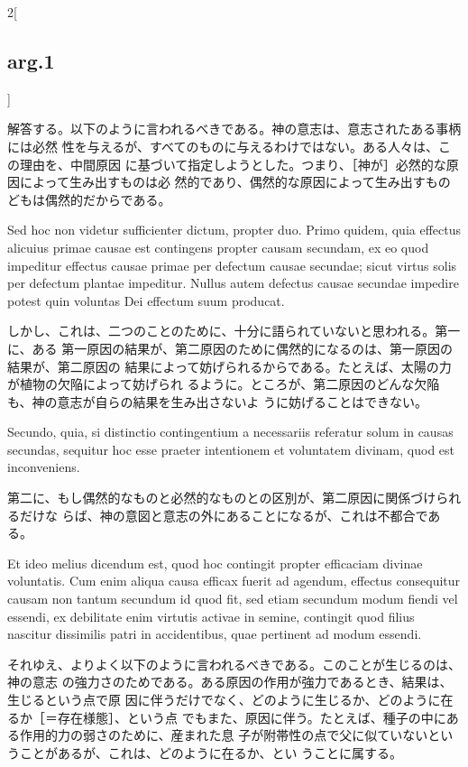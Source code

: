 \documentclass[paper=a4paper,fontsize=10pt,jafontsize=9pt,titlepage]{jlreq}
\begin{document}
\begin{paracol}{2}[\subsection{arg.1}]
\switchcolumn

解答する。以下のように言われるべきである。神の意志は、意志されたある事柄には必然
性を与えるが、すべてのものに与えるわけではない。ある人々は、この理由を、中間原因
に基づいて指定しようとした。つまり、［神が］必然的な原因によって生み出すものは必
然的であり、偶然的な原因によって生み出すものどもは偶然的だからである。

\switchcolumn*


Sed hoc non videtur sufficienter dictum, propter duo. Primo quidem, quia
effectus alicuius primae causae est contingens propter causam secundam, ex eo
quod impeditur effectus causae primae per defectum causae secundae; sicut virtus
solis per defectum plantae impeditur. Nullus autem defectus causae secundae
impedire potest quin voluntas Dei effectum suum producat.

\switchcolumn

しかし、これは、二つのことのために、十分に語られていないと思われる。第一に、ある
第一原因の結果が、第二原因のために偶然的になるのは、第一原因の結果が、第二原因の
結果によって妨げられるからである。たとえば、太陽の力が植物の欠陥によって妨げられ
るように。ところが、第二原因のどんな欠陥も、神の意志が自らの結果を生み出さないよ
うに妨げることはできない。

\switchcolumn*


Secundo, quia, si distinctio contingentium a necessariis referatur solum in
causas secundas, sequitur hoc esse praeter intentionem et voluntatem divinam,
quod est inconveniens.

\switchcolumn

第二に、もし偶然的なものと必然的なものとの区別が、第二原因に関係づけられるだけな
 らば、神の意図と意志の外にあることになるが、これは不都合である。

\switchcolumn*


Et ideo melius
dicendum est, quod hoc contingit propter efficaciam divinae
voluntatis. Cum enim aliqua causa efficax fuerit ad agendum, effectus
consequitur causam non tantum secundum id quod fit, sed etiam secundum
modum fiendi vel essendi, ex debilitate enim virtutis activae in semine,
contingit quod filius nascitur dissimilis patri in accidentibus, quae
pertinent ad modum essendi.

\switchcolumn

それゆえ、よりよく以下のように言われるべきである。このことが生じるのは、神の意志
の強力さのためである。ある原因の作用が強力であるとき、結果は、生じるという点で原
因に伴うだけでなく、どのように生じるか、どのように在るか［＝存在様態］、という点
でもまた、原因に伴う。たとえば、種子の中にある作用的力の弱さのために、産まれた息
子が附帯性の点で父に似ていないということがあるが、これは、どのように在るか、とい
うことに属する。


\end{paracol}
\end{document}
